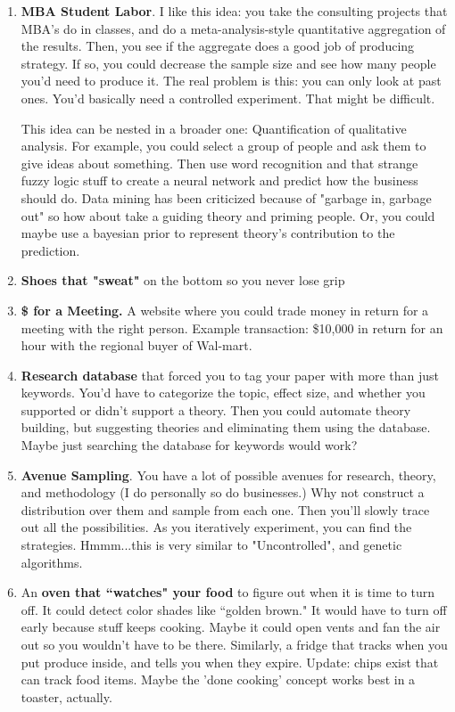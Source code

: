\documentclass[paper=a4, fontsize=11pt]{scrartcl} %
\numberwithin{equation}{section} %
\numberwithin{figure}{section} %
\numberwithin{table}{section} %
\begin{document}
\begin{enumerate}
\item \textbf{MBA Student Labor}.  I like this idea: you take the consulting projects that MBA's do in classes, and do a meta-analysis-style quantitative aggregation of the results.  Then, you see if the aggregate does a good job of producing strategy.  If so, you could decrease the sample size and see how many people you'd need to produce it.  The real problem is this: you can only look at past ones.  You'd basically need a controlled experiment.  That might be difficult.  

This idea can be nested in a broader one: Quantification of qualitative analysis.  For example, you could select a group of people and ask them to give ideas about something.  Then use word recognition and that strange fuzzy logic stuff to create a neural network and predict how the business should do.  Data mining has been criticized because of "garbage in, garbage out" so how about take a guiding theory and priming people.  Or, you could maybe use a bayesian prior to represent theory's contribution to the prediction. 

\item  \textbf{Shoes that "sweat"} on the bottom so you never lose grip

\item \textbf{\$ for a Meeting.}  A website where you could trade money in return for a meeting with the right person.  Example transaction: 
\$10,000 in return for an hour with the regional buyer of Wal-mart.

\item \textbf{Research database} that forced you to tag your paper with more than just keywords.  You'd have to categorize the topic, effect size, and whether you supported or didn't support a theory.  Then you could automate theory building, but suggesting theories and eliminating them using the database.  Maybe just searching the database for keywords would work?  

\item \textbf{Avenue Sampling}.  You have a lot of possible avenues for research, theory, and methodology (I 
do personally so do businesses.)  Why not construct a distribution over them
and sample from each one.  Then you'll slowly trace out all the possibilities.  As
you iteratively experiment, you can find the strategies.  Hmmm...this is very
similar to "Uncontrolled", and genetic algorithms.  

\item An \textbf{oven that ``watches" your food} to figure out when it is time to turn off.  It could detect color shades like ``golden brown."  It would have to turn off early because stuff keeps cooking.  Maybe it could open vents and fan the air out so you wouldn't have to be there.  Similarly, a fridge that tracks when you put produce inside, and tells you when they expire.  Update: chips exist that can track food items.  Maybe the 'done cooking' concept works best in a toaster, actually.


\end{enumerate}
\end{document}

